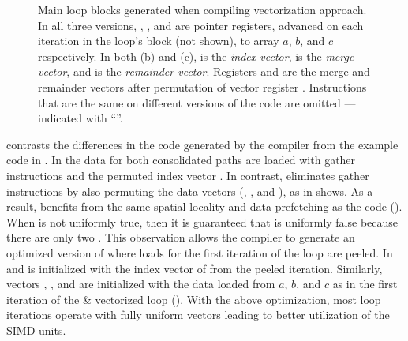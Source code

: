 \begin{figure}[htbp]
\caption{Main loop blocks generated when compiling  vectorization approach. In all three versions, , , and  are pointer registers, advanced on each iteration in the loop's  block (not shown), to array $a$, $b$, and $c$ respectively. In both (b) and (c),  is the \emph{index vector},  is the \emph{merge vector}, and \vR is the \emph{remainder vector}. Registers  and  are the merge and remainder vectors after permutation of vector register . Instructions that are the same on different versions of the code are omitted --- indicated with ``\code{//}''.}
\label{fig:simple-loop-versions}
\end{figure}


 contrasts the differences in the code generated by the compiler from the example code in .
In  the data for both consolidated paths are loaded with gather instructions and the permuted index vector \vM.
In contrast, \ALCdp eliminates gather instructions by also permuting  the data vectors (, , and ), as  in  shows.
As a result, \ALCdp benefits from the same spatial locality and data prefetching as the \ifconverted code ().
When \vM is not uniformly true, then it is guaranteed that \vR is uniformly false because there are only two \cpaths.
This observation allows the compiler to generate an optimized version of \iterALC where loads for the first iteration of the loop are peeled.
In  and  \vM is initialized with the index vector of from the peeled iteration.
Similarly, vectors , , and  are initialized with the data loaded from $a$, $b$, and $c$ as in the first iteration of the \ifconverted \& vectorized loop ().
With the above optimization, most loop iterations operate with fully uniform vectors leading to better utilization of the SIMD units.

